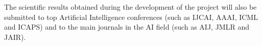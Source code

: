 \documentclass[10pt,a4paper]{paper}
\begin{document}
The scientific results obtained during the development of the project will also be submitted to top Artificial Intelligence conferences (such as IJCAI, AAAI, ICML and ICAPS) and to the main journals in the AI field (such as AIJ, JMLR and JAIR).

\vspace{0.5cm}

\begin{tiny}

\end{tiny}

\end{document}
